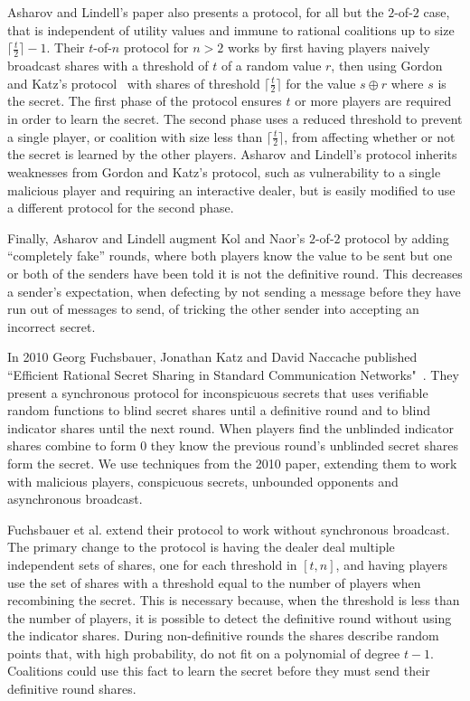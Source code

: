 \documentclass{dalcsthesis}
\begin{document}
Asharov and Lindell's paper also presents a protocol, for all but the $2$-of-$2$ case, that is independent of utility values and immune to rational coalitions up to size $\lceil \frac{t}{2} \rceil - 1$. Their $t$-of-$n$ protocol for $n > 2$ works by first having players naively broadcast shares with a threshold of $t$ of a random value $r$, then using Gordon and Katz's protocol~\cite{gordon06} with shares of threshold $\lceil \frac{t}{2} \rceil$ for the value $s \oplus r$ where $s$ is the secret. The first phase of the protocol ensures $t$ or more players are required in order to learn the secret. The second phase uses a reduced threshold to prevent a single player, or coalition with size less than $\lceil \frac{t}{2} \rceil$, from affecting whether or not the secret is learned by the other players. Asharov and Lindell's protocol inherits weaknesses from Gordon and Katz's protocol, such as vulnerability to a single malicious player and requiring an interactive dealer, but is easily modified to use a different protocol for the second phase.

Finally, Asharov and Lindell augment Kol and Naor's $2$-of-$2$ protocol by adding ``completely fake'' rounds, where both players know the value to be sent but one or both of the senders have been told it is not the definitive round. This decreases a sender's expectation, when defecting by not sending a message before they have run out of messages to send, of tricking the other sender into accepting an incorrect secret.

In 2010 Georg Fuchsbauer, Jonathan Katz and David Naccache published ``Efficient Rational Secret Sharing in Standard Communication Networks"~\cite{fuch10}. They present a synchronous protocol for inconspicuous secrets that uses verifiable random functions to blind secret shares until a definitive round and to blind indicator shares until the next round. When players find the unblinded indicator shares combine to form 0 they know the previous round's unblinded secret shares form the secret. We use techniques from the 2010 paper, extending them to work with malicious players, conspicuous secrets, unbounded opponents and asynchronous broadcast.

Fuchsbauer et al. extend their protocol to work without synchronous broadcast. The primary change to the protocol is having the dealer deal multiple independent sets of shares, one for each threshold in $[t, n]$, and having players use the set of shares with a threshold equal to the number of players when recombining the secret. This is necessary because, when the threshold is less than the number of players, it is possible to detect the definitive round without using the indicator shares. During non-definitive rounds the shares describe random points that, with high probability, do not fit on a polynomial of degree $t-1$. Coalitions could use this fact to learn the secret before they must send their definitive round shares.
\end{document}
